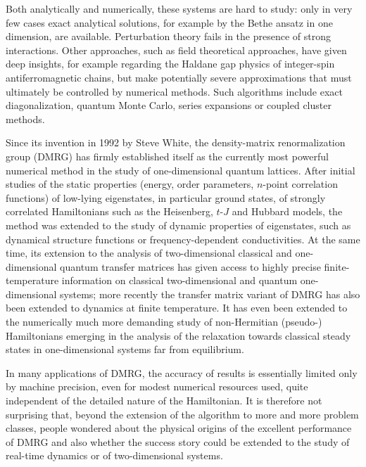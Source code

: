 \documentclass[a4paper,10pt,oneside,onecolumn,1p,times]{elsarticle}
\begin{document}
Both analytically and numerically, these systems are hard to study: only in very few cases exact analytical solutions, for example by the Bethe ansatz in one dimension, are available\cite{Bethe31,Lieb68}. Perturbation theory fails in the presence of strong interactions. Other approaches, such as field theoretical approaches, have given deep insights, for example regarding the Haldane gap physics of integer-spin antiferromagnetic chains\cite{Haldane83}, but make potentially severe approximations that must ultimately be controlled by numerical methods. Such algorithms include exact diagonalization, quantum Monte Carlo, series expansions or coupled cluster methods.

Since its invention in 1992 by Steve White\cite{White92,White93}, the density-matrix renormalization group (DMRG) has firmly established itself as the currently most powerful numerical method
in the study of one-dimensional quantum lattices\cite{Schollwoeck05,Hallberg06}. After initial studies of the static properties (energy, order parameters, $n$-point correlation functions) of low-lying eigenstates, in particular ground states, of strongly correlated Hamiltonians such as the Heisenberg, $t$-$J$ and Hubbard models, the method was extended to the study of 
dynamic properties of eigenstates, such as dynamical structure functions or frequency-dependent conductivities\cite{Hallberg95,Ramasesha97,Kuhner99,Jeckelmann02}. At the same time, its extension to the analysis of two-dimensional classical \cite{Nishino95} and one-dimensional quantum \cite{Wang97,Shibata97} transfer matrices has given access to highly precise finite-temperature information on classical two-dimensional and quantum one-dimensional systems;  more recently the transfer matrix variant of DMRG has also been extended to dynamics at finite temperature\cite{Sirker05}. It has even been extended to the numerically much more demanding study of non-Hermitian (pseudo-) Hamiltonians emerging in the analysis of the relaxation towards classical steady states in one-dimensional systems far from equilibrium\cite{Hieida98,Carlon99,Carlon01,Henkel01}. 

In many applications of DMRG, the accuracy of results is essentially limited only by machine precision, even for modest numerical resources used, quite independent of the detailed nature of the Hamiltonian. It is therefore not surprising that, beyond the extension of the algorithm to more and more problem classes, people wondered about the physical origins of the excellent performance of DMRG and also whether the success story could be extended to the study of real-time dynamics or of two-dimensional systems. 
\end{document}

